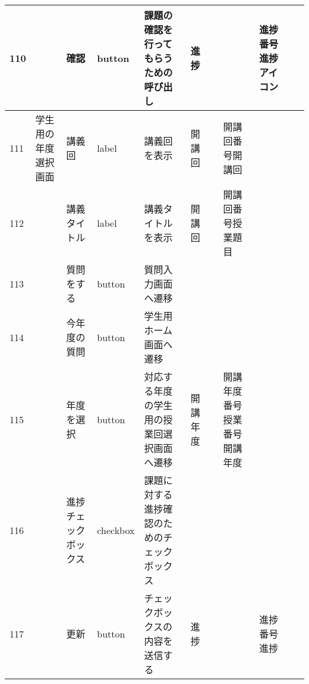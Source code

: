 \begin{table}[]
\begin{tabular}{|l|l|l|l|l|l|l|l|l|l|l|}
110 &               & 確認               & button   & 課題の確認を行ってもらうための呼び出し                                               & 進捗      &                       &                    & 進捗番号進捗アイコン      &                               &                                                                \\ \hline
111 & 学生用の年度選択画面    & 講義回              & label    & 講義回を表示                                                            & 開講回     &                       & 開講回番号開講回           &                 &                               &                                                                \\ \hline
112 &               & 講義タイトル           & label    & 講義タイトルを表示                                                         & 開講回     &                       & 開講回番号授業題目          &                 &                               &                                                                \\ \hline
113 &               & 質問をする            & button   & 質問入力画面へ遷移                                                         &         &                       &                    &                 &                               &                                                                \\ \hline
114 &               & 今年度の質問           & button   & 学生用ホーム画面へ遷移                                                       &         &                       &                    &                 &                               &                                                                \\ \hline
115 &               & 年度を選択            & button   & 対応する年度の学生用の授業回選択画面へ遷移                                             & 開講年度    &                       & 開講年度番号授業番号開講年度     &                 &                               &                                                                \\ \hline
116 &               & 進捗チェックボックス       & checkbox & 課題に対する進捗確認のためのチェックボックス                                            &         &                       &                    &                 &                               &                                                                \\ \hline
117 &               & 更新               & button   & チェックボックスの内容を送信する                                                  & 進捗      &                       &                    & 進捗番号進捗          &                               &                                                                \\ \hline

\end{tabular}
\end{table}
